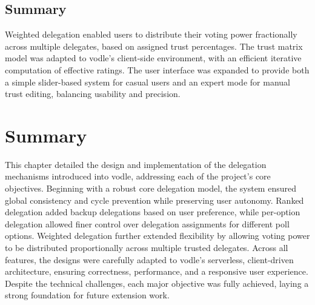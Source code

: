\subsection{Summary}

Weighted delegation enabled users to distribute their voting power fractionally across multiple delegates, based on assigned trust percentages. The trust matrix model was adapted to vodle's client-side environment, with an efficient iterative computation of effective ratings. The user interface was expanded to provide both a simple slider-based system for casual users and an expert mode for manual trust editing, balancing usability and precision.



\section{Summary}

This chapter detailed the design and implementation of the delegation mechanisms introduced into vodle, addressing each of the project's core objectives. Beginning with a robust core delegation model, the system ensured global consistency and cycle prevention while preserving user autonomy. Ranked delegation added backup delegations based on user preference, while per-option delegation allowed finer control over delegation assignments for different poll options. Weighted delegation further extended flexibility by allowing voting power to be distributed proportionally across multiple trusted delegates. Across all features, the designs were carefully adapted to vodle's serverless, client-driven architecture, ensuring correctness, performance, and a responsive user experience. Despite the technical challenges, each major objective was fully achieved, laying a strong foundation for future extension work.